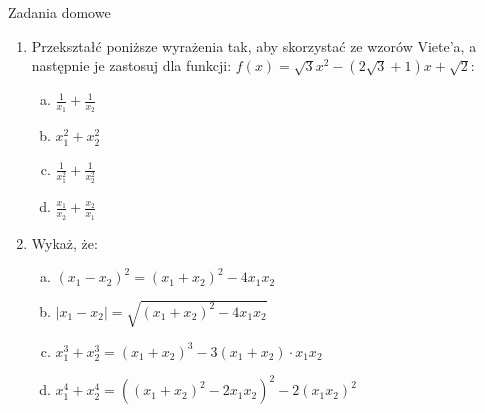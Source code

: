 \documentclass[12pt,a4paper]{article}
\begin{document}
	\begin{center}
		\LARGE Zadania domowe
	\end{center}
	\vspace{1.5cm}
	
	\begin{enumerate}[1.]
		\item Przekształć poniższe wyrażenia tak, aby skorzystać ze wzorów Viete'a, a następnie je zastosuj dla funkcji: $f(x)=\sqrt{3}x^2-(2\sqrt{3}+1)x+\sqrt{2}$:
		
		\begin{enumerate}[a)]
			\item $\frac{1}{x_1}+\frac{1}{x_2}$
			\item $x_1^2+x_2^2$
			\item $\frac{1}{x_1^2}+\frac{1}{x_2^2}$
			\item $\frac{x_1}{x_2}+\frac{x_2}{x_1}$
		\end{enumerate}
	
		\item Wykaż, że:
		\begin{enumerate}[a)]
			\item $(x_1-x_2)^2=(x_1+x_2)^2-4x_1x_2$
			\item $|x_1-x_2|=\sqrt{(x_1+x_2)^2-4x_1x_2}$
			\item $x_1^3+x_2^3=(x_1+x_2)^3-3(x_1+x_2)\cdot x_1x_2$
			\item $x_1^4+x_2^4=((x_1+x_2)^2-2x_1x_2)^2-2(x_1x_2)^2$
		\end{enumerate}
	\end{enumerate}
	
	
	
\end{document}
